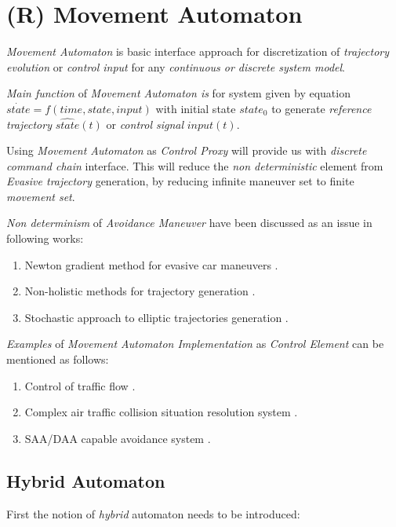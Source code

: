 \section{(R) Movement Automaton}\label{sec:MovementAutomatonBackground}

    \noindent\emph{Movement Automaton} is basic interface approach for discretization of \emph{trajectory evolution}  or \emph{control input} for any \emph{continuous or discrete system model}.
    
    \emph{Main function} of \emph{Movement Automaton is} for system given by equation $\dot{state}=f(time,state,input)$ with initial state $state_0$ to generate \emph{reference trajectory} $\hat{state}(t)$ or \emph{control signal} $input(t)$.
    
    Using \emph{Movement Automaton} as \emph{Control Proxy} will provide us with \emph{discrete command chain} interface. This will reduce the \emph{non deterministic} element from \emph{Evasive trajectory} generation, by reducing infinite maneuver set to finite \emph{movement set}.
    
    \emph{Non determinism} of \emph{Avoidance Maneuver} have been discussed as an issue in following works:
    \begin{enumerate}
        \item Newton gradient method for evasive car maneuvers \cite{vsantin2011combined}.
        \item Non-holistic methods for trajectory generation \cite{pin1990autonomous}.
        \item Stochastic approach to elliptic trajectories generation \cite{andrzejak2001epileptic}.
    \end{enumerate}
    
    \emph{Examples} of \emph{Movement Automaton Implementation} as \emph{Control Element} can be mentioned as follows:
    \begin{enumerate}
        \item Control of traffic flow \cite{kuwata2009real}.
        \item Complex air traffic collision situation resolution system  \cite{frazzoli2001robust,frazzoli2000trajectory}.
        \item SAA/DAA capable avoidance system \cite{gomola2017obstacle}.
    \end{enumerate}


    \subsection{Hybrid Automaton}\label{s:HybridAutomaton}
    \noindent First the notion of  \emph{hybrid} automaton  \cite{lazar2006model,borrelli2006mpc,daws1996tool} needs to be introduced:

